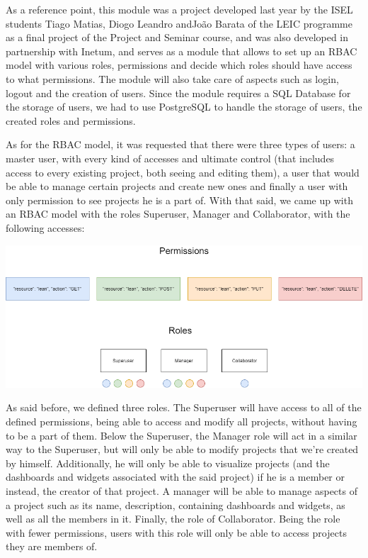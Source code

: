\documentclass[a4paper,twoside,10pt]{report}
\begin{document}
As a reference point, this module was a project developed last year by the ISEL students Tiago Matias, Diogo Leandro andJoão Barata of the LEIC programme as a final project of the Project and Seminar course, and was also developed in partnership with Inetum, and serves as a module that allows to set up an RBAC model with various roles, permissions and decide which roles should have access to what permissions. The module will also take care of aspects such as login, logout and the creation of users. Since the module requires a SQL Database for the storage of users, we had to use  PostgreSQL to handle the storage of users, the created roles and permissions.

As for the RBAC model, it was requested that there were three types of users: a master user, with every kind of accesses and ultimate control (that includes access to every existing project, both seeing and editing them), a user that would be able to manage certain projects and create new ones and finally a user with only permission to see projects he is a part of.
With that said, we came up with an RBAC model with the roles Superuser, Manager and Collaborator, with the following accesses:
\\ \newline

\begin{center}
    \includegraphics[width=\textwidth]{lean-rbac-model.png}
\end{center}

As said before, we defined three roles. The Superuser will have access to all of the defined permissions, being able to access and modify all projects,  without having to be a part of them. 
Below the Superuser, the Manager role will act in a similar way to the Superuser, but will only be able to modify projects that we're created by himself. Additionally, he will only be able to visualize projects (and the dashboards and widgets associated with the said project) if he is a member or instead, the creator of that project. A manager will be able to manage aspects of a project such as its name, description, containing dashboards and widgets, as well as all the members in it.
Finally, the role of Collaborator. Being the role with fewer permissions, users with this role will only be able to access projects they are members of.
\end{document}
